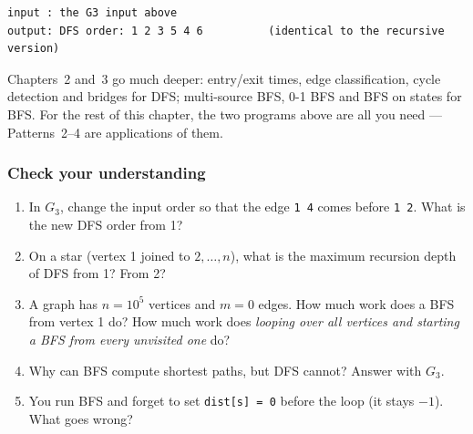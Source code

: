 \begin{lstlisting}[style=trace]
input : the G3 input above
output: DFS order: 1 2 3 5 4 6          (identical to the recursive version)
\end{lstlisting}

Chapters~2 and~3 go much deeper: entry/exit times, edge classification, cycle detection and bridges for DFS; multi-source BFS, 0-1 BFS and BFS on states for BFS. For the rest of this chapter, the two programs above are all you need --- Patterns~2--4 are applications of them.

\subsubsection*{Check your understanding}

\begin{enumerate}[leftmargin=*]
    \item In $G_3$, change the input order so that the edge \texttt{1 4} comes before \texttt{1 2}. What is the new DFS order from 1?
    \item On a star (vertex 1 joined to $2,\dots,n$), what is the maximum recursion depth of DFS from 1? From 2?
    \item A graph has $n=10^5$ vertices and $m=0$ edges. How much work does a BFS from vertex 1 do? How much work does \emph{looping over all vertices and starting a BFS from every unvisited one} do?
    \item Why can BFS compute shortest paths, but DFS cannot? Answer with $G_3$.
    \item You run BFS and forget to set \texttt{dist[s] = 0} before the loop (it stays $-1$). What goes wrong?
\end{enumerate}

